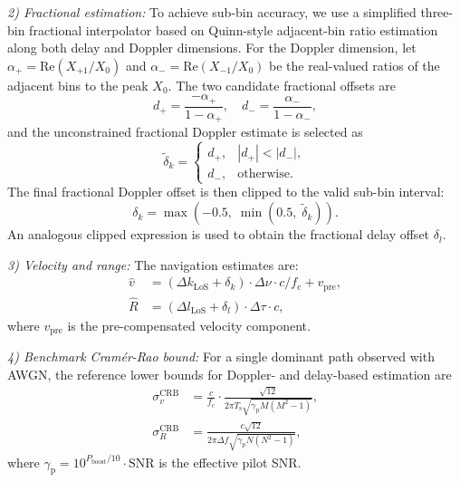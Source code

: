 ﻿\documentclass[conference]{IEEEtran}
\begin{document}
\textit{2) Fractional estimation:} To achieve sub-bin accuracy, we use a simplified three-bin fractional interpolator based on Quinn-style adjacent-bin ratio estimation \cite{quinn1997} along both delay and Doppler dimensions. For the Doppler dimension, let $\alpha_+ = \mathrm{Re}(X_{+1}/X_0)$ and $\alpha_- = \mathrm{Re}(X_{-1}/X_0)$ be the real-valued ratios of the adjacent bins to the peak $X_0$. The two candidate fractional offsets are
\begin{equation}\label{eq:quinn}
  d_+ = \frac{-\alpha_+}{1 - \alpha_+}, \quad
  d_- = \frac{\alpha_-}{1 - \alpha_-},
\end{equation}
and the unconstrained fractional Doppler estimate is selected as
\begin{equation}\label{eq:doppler_raw}
  \tilde{\delta}_k =
  \begin{cases}
    d_+, & |d_+| < |d_-|, \\
    d_-, & \text{otherwise}.
  \end{cases}
\end{equation}
The final fractional Doppler offset is then clipped to the valid sub-bin interval:
\begin{equation}\label{eq:doppler_clip}
  \delta_k = \max\!\left(-0.5,\; \min\!\left(0.5,\; \tilde{\delta}_k\right)\right).
\end{equation}
An analogous clipped expression is used to obtain the fractional delay offset $\delta_l$.

\textit{3) Velocity and range:} The navigation estimates are:
\begin{align}
  \hat{v} &= (\Delta k_{\mathrm{LoS}} + \delta_k) \cdot \Delta\nu \cdot c / f_{\mathrm{c}} + v_{\mathrm{pre}}, \label{eq:vel_est} \\
  \hat{R} &= (\Delta l_{\mathrm{LoS}} + \delta_l) \cdot \Delta\tau \cdot c, \label{eq:range_est}
\end{align}
where $v_{\mathrm{pre}}$ is the pre-compensated velocity component.

\textit{4) Benchmark Cram\'{e}r-Rao bound:} For a single dominant path observed with AWGN, the reference lower bounds for Doppler- and delay-based estimation are \cite{kay1993}
\begin{align}
  \sigma_v^{\mathrm{CRB}} &= \frac{c}{f_{\mathrm{c}}} \cdot \frac{\sqrt{12}}{2\pi T_{\mathrm{s}} \sqrt{\gamma_{\mathrm{p}} M(M^2-1)}}, \label{eq:crb_vel} \\
  \sigma_R^{\mathrm{CRB}} &= \frac{c\sqrt{12}}{2\pi \Delta f \sqrt{\gamma_{\mathrm{p}} N(N^2-1)}}, \label{eq:crb_range}
\end{align}
where $\gamma_{\mathrm{p}} = 10^{P_{\mathrm{boost}}/10} \cdot \mathrm{SNR}$ is the effective pilot SNR.
\end{document}
